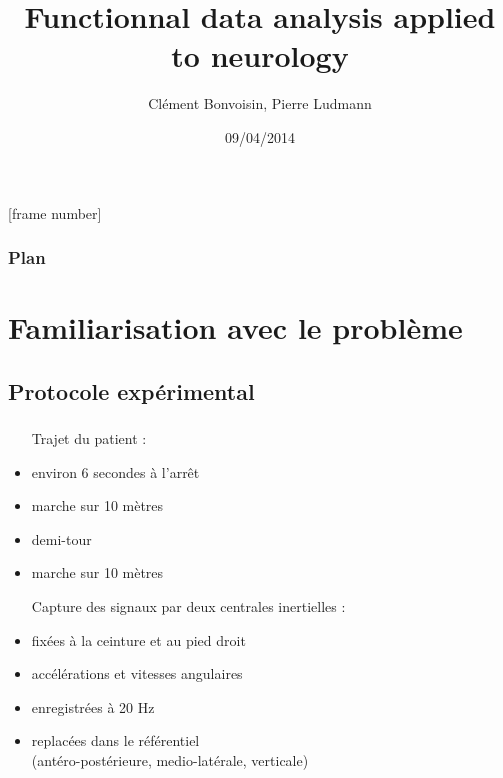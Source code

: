 \documentclass{beamer}
\title[Signal segmentation]{Functionnal data analysis applied to neurology}
\author{Clément Bonvoisin, Pierre Ludmann}
\institute{CMLA (ENS Cachan), Cognac-G (Paris V)}
\date{09/04/2014}
\begin{document}
[frame number]

\begin{frame}
\titlepage
\end{frame}

\begin{frame}
\frametitle{Plan}
  \tableofcontents[hideallsubsections]
\end{frame}


\section{Familiarisation avec le problème}
\subsection{Protocole expérimental}

\begin{frame}
\frametitle{}

\begin{itemize}

\item[Trajet] du patient : 
\item environ 6 secondes à l'arrêt
\item marche sur 10 mètres
\item demi-tour
\item marche sur 10 mètres

\item[Capture] des signaux par deux centrales inertielles : 
\item fixées à la ceinture et au pied droit
\item accélérations et vitesses angulaires
\item enregistrées à 20 Hz
\item replacées dans le référentiel\\(antéro-postérieure, medio-latérale, verticale)

\end{itemize}

\end{frame}
\end{document}

